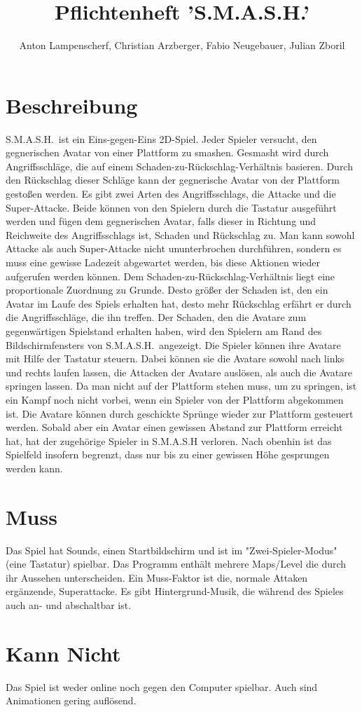 \documentclass[11pt]{article}
\title{Pflichtenheft 'S.M.A.S.H.'}
\author{Anton Lampenscherf, Christian Arzberger, Fabio Neugebauer, Julian Zboril}
\begin{document}
    \maketitle

    \section{Beschreibung}\label{sec:beschreibung}
    S.M.A.S.H.\ ist ein Eins-gegen-Eins 2D-Spiel.
    Jeder Spieler versucht, den gegnerischen Avatar von einer Plattform zu \„smashen\“.
    Gesmasht wird durch Angriffsschläge, die auf einem Schaden-zu-Rückschlag-Verhältnis basieren.
    Durch den Rückschlag dieser Schläge kann der gegnerische Avatar von der Plattform gestoßen werden.
    Es gibt zwei Arten des Angriffsschlags, die Attacke und die Super-Attacke.
    Beide können von den Spielern durch die Tastatur ausgeführt werden und fügen dem gegnerischen Avatar, falls dieser in Richtung und Reichweite des Angriffsschlags ist, Schaden und Rückschlag zu. Man kann sowohl Attacke als auch Super-Attacke nicht ununterbrochen durchführen, sondern es muss eine gewisse Ladezeit abgewartet werden, bis diese Aktionen wieder aufgerufen werden können.
    Dem Schaden-zu-Rückschlag-Verhältnis liegt eine proportionale Zuordnung zu Grunde.
    Desto größer der Schaden ist, den ein Avatar im Laufe des Spiels erhalten hat, desto mehr Rückschlag erfährt er durch die Angriffsschläge, die ihn treffen.
    Der Schaden, den die Avatare zum gegenwärtigen Spielstand erhalten haben, wird den Spielern am Rand des Bildschirmfensters von S.M.A.S.H.\ angezeigt.
    Die Spieler können ihre Avatare mit Hilfe der Tastatur steuern.
    Dabei können sie die Avatare sowohl nach links und rechts laufen lassen, die Attacken der Avatare auslösen, als auch die Avatare springen lassen.
    Da man nicht auf der Plattform stehen muss, um zu springen, ist ein Kampf noch nicht vorbei, wenn ein Spieler von der Plattform abgekommen ist.
    Die Avatare können durch geschickte Sprünge wieder zur Plattform gesteuert werden.
    Sobald aber ein Avatar einen gewissen Abstand zur Plattform erreicht hat, hat der zugehörige Spieler in S.M.A.S.H verloren.
    Nach obenhin ist das Spielfeld insofern begrenzt, dass nur bis zu einer gewissen Höhe gesprungen werden kann.

    \section{Muss}\label{sec:muss}
    Das Spiel hat Sounds, einen Startbildschirm und ist im "Zwei-Spieler-Modus" (eine Tastatur) spielbar.
    Das Programm enthält mehrere Maps/Level die durch ihr Aussehen unterscheiden.
    Ein Muss-Faktor ist die, normale Attaken ergänzende, Superattacke.
    Es gibt Hintergrund-Musik, die während des Spieles auch an- und abschaltbar ist.

    \section{Kann Nicht}\label{sec:kann-nicht}
    Das Spiel ist weder online noch gegen den Computer spielbar.
    Auch sind Animationen gering auflösend.
\end{document}
